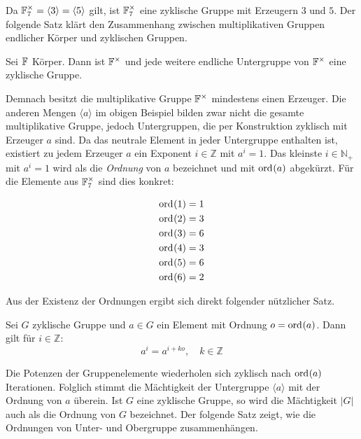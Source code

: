 Da $\field{7}^\times = \langle 3 \rangle = \langle 5 \rangle$ gilt, ist $\field{7}^\times$ eine zyklische Gruppe mit Erzeugern $3$ und $5$. Der folgende Satz klärt den Zusammenhang zwischen multiplikativen Gruppen endlicher Körper und zyklischen Gruppen.

\begin{satz}
    Sei $\field{}$ Körper. Dann ist $\field{}^\times$ und jede weitere endliche Untergruppe von $\field{}^\times$ eine zyklische Gruppe.
\end{satz}

Demnach besitzt die multiplikative Gruppe $\field{}^\times$ mindestens einen Erzeuger. Die anderen Mengen $\langle a \rangle$ im obigen Beispiel bilden zwar nicht die gesamte multiplikative Gruppe, jedoch Untergruppen, die per Konstruktion zyklisch mit Erzeuger $a$ sind. Da das neutrale Element in jeder Untergruppe enthalten ist, existiert zu jedem Erzeuger $a$ ein Exponent $i \in \mathbb{Z}$ mit $a^i = 1$. Das kleinste $i \in \mathbb{N}_+$ mit $a^i = 1$ wird als die \emph{Ordnung} von $a$ bezeichnet und mit $\ord{a}$ abgekürzt. Für die Elemente aus $\field{7}^\times$ sind dies konkret:

\begin{align*}
    \ord{1} &= 1 \\
    \ord{2} &= 3 \\
    \ord{3} &= 6 \\
    \ord{4} &= 3 \\
    \ord{5} &= 6 \\
    \ord{6} &= 2
\end{align*}

Aus der Existenz der Ordnungen ergibt sich direkt folgender nützlicher Satz.

\begin{satz} \label{satz:cyclicity}
    Sei $G$ zyklische Gruppe und $a \in G$ ein Element mit Ordnung $o = \ord{a}$. Dann gilt für $i \in \mathbb{Z}$:
    \begin{equation*}
        a^i = a^{i+ko}, \quad k \in \mathbb{Z}
    \end{equation*}
\end{satz}

Die Potenzen der Gruppenelemente wiederholen sich zyklisch nach $\ord{a}$ Iterationen. Folglich stimmt die Mächtigkeit der Untergruppe $\langle a \rangle$ mit der Ordnung von $a$ überein. Ist $G$ eine zyklische Gruppe, so wird die Mächtigkeit $|G|$ auch als die Ordnung von $G$ bezeichnet.
Der folgende Satz zeigt, wie die Ordnungen von Unter- und Obergruppe zusammenhängen.

